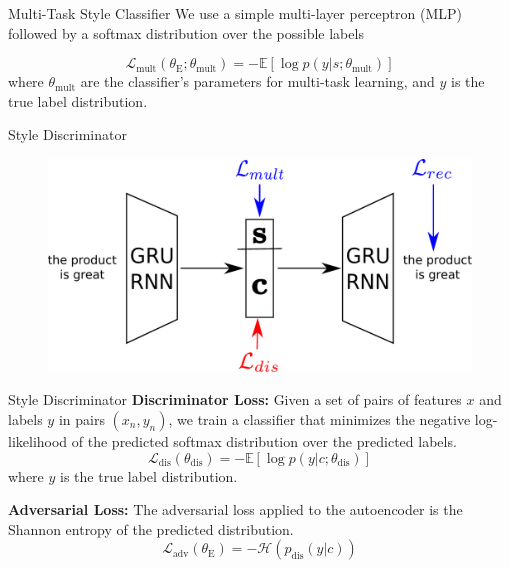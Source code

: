 \documentclass[aspectratio=169]{beamer}
\newcommand{\loss}[1]{\mathcal{L}_{\text{#1}}}
\newcommand{\param}[1]{\theta_{\text{#1}}}
\begin{document}
\begin{frame}{Multi-Task Style Classifier}
	We use a simple multi-layer perceptron (MLP) followed by a softmax distribution over the possible labels

	\begin{equation} \label{eqn:multi-task-loss}
		\loss{mult}(\param{E};\param{mult}) = - \mathbb{E} [\log p(y|s;\param{mult})]
	\end{equation}
	where $\param{mult}$ are the classifier's parameters for multi-task learning, and $y$ is the true label distribution.
\end{frame}

\begin{frame}{Style Discriminator}
	\centering
	\begin{figure}[ht]
		\includegraphics[width=\textwidth]{images/overview-training-3}
	\end{figure}
\end{frame}

\begin{frame}{Style Discriminator}
	\textbf{Discriminator Loss:}
	Given a set of pairs of features $x$ and labels $y$ in pairs $(x_n, y_n)$, we train a classifier that minimizes the negative log-likelihood of the predicted softmax distribution over the predicted labels.
	\begin{equation}
		\loss{dis}(\param{dis}) = - \mathbb{E} [\log p(y|c;\param{dis})]
	\end{equation}
	where $y$ is the true label distribution.

	\textbf{Adversarial Loss:}
	The adversarial loss applied to the autoencoder is the Shannon entropy of the predicted distribution.
	\begin{equation}
		\loss{adv}(\param{E}) = - \mathcal{H}(p_\text{dis}(y|c))
	\end{equation}
\end{frame}
\end{document}
